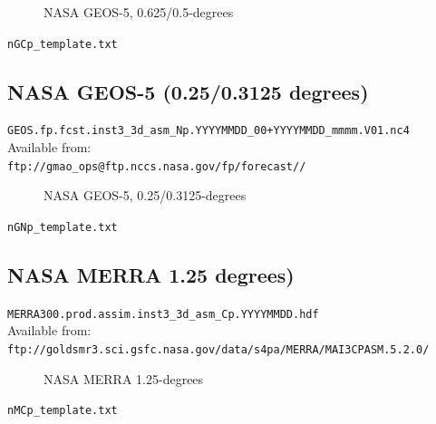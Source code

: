 \documentclass[11pt]{article}   %
\begin{document}
\begin{figure}[htbp]\begin{center}
\parbox{15cm}{\caption{\label{FigGCp}
NASA GEOS-5, 0.625/0.5-degrees
}}
\end{center}\end{figure}
\clearpage
\verb|nGCp_template.txt| \\
\tiny  \normalsize

\clearpage
\subsection{NASA GEOS-5 (0.25/0.3125 degrees)}

\verb|GEOS.fp.fcst.inst3_3d_asm_Np.YYYYMMDD_00+YYYYMMDD_mmmm.V01.nc4|\\
Available from:\\
\verb|ftp://gmao_ops@ftp.nccs.nasa.gov/fp/forecast//|

\begin{figure}[htbp]\begin{center}
\parbox{15cm}{\caption{\label{FigGNp}
NASA GEOS-5, 0.25/0.3125-degrees
}}
\end{center}\end{figure}
\clearpage
\verb|nGNp_template.txt| \\
\tiny  \normalsize

\clearpage
\subsection{NASA MERRA 1.25 degrees)}

\verb|MERRA300.prod.assim.inst3_3d_asm_Cp.YYYYMMDD.hdf|\\
Available from:\\
\verb|ftp://goldsmr3.sci.gsfc.nasa.gov/data/s4pa/MERRA/MAI3CPASM.5.2.0/|

\begin{figure}[htbp]\begin{center}
\parbox{15cm}{\caption{\label{FigMCp}
NASA MERRA 1.25-degrees
}}
\end{center}\end{figure}
\clearpage
\verb|nMCp_template.txt| \\
\tiny  \normalsize
\end{document}
